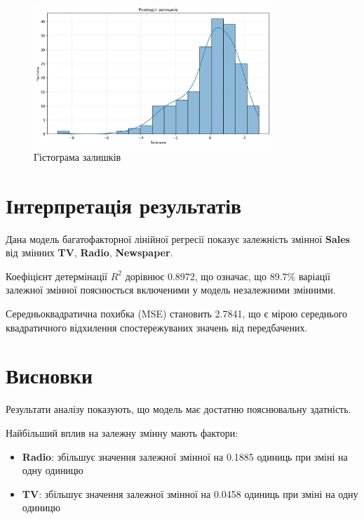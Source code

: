 \documentclass{article}
\begin{document}
    \vspace{0.5cm}
    
    \begin{figure}[H]
       \centering
       \includegraphics[width=0.8\textwidth]{residuals_hist.png}
       \caption{Гістограма залишків}
       \label{fig:гістограма_залишків}
    \end{figure}

    \vspace{0.5cm}
    

    \section{Інтерпретація результатів}

    Дана модель багатофакторної лінійної регресії показує залежність змінної \textbf{Sales} від змінних \textbf{TV}, \textbf{Radio}, \textbf{Newspaper}.

    Коефіцієнт детермінації $R^2$ дорівнює 0.8972, що означає, що 89.7\% варіації залежної змінної пояснюється включеними у модель незалежними змінними.

    Середньоквадратична похибка (MSE) становить 2.7841, що є мірою середнього квадратичного відхилення спостережуваних значень від передбачених.

    \vspace{0.5cm}

    \section{Висновки}

    Результати аналізу показують, що модель має достатню пояснювальну здатність.
    
    Найбільший вплив на залежну змінну мають фактори:
    \begin{itemize}
        \item \textbf{Radio}: збільшує значення залежної змінної на 0.1885 одиниць при зміні на одну одиницю
    \item \textbf{TV}: збільшує значення залежної змінної на 0.0458 одиниць при зміні на одну одиницю
\end{itemize}
    
    
\end{document}
